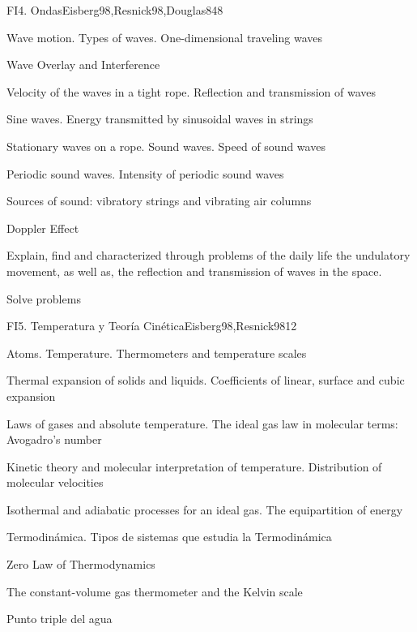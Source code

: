 \begin{syllabus}
\begin{unit}{FI4. Ondas}{Eisberg98,Resnick98,Douglas84}{8}
\begin{topics}
         \item  Wave motion. Types of waves. One-dimensional traveling waves
	 \item  Wave Overlay and Interference
         \item  Velocity of the waves in a tight rope. Reflection and transmission of waves
	 \item  Sine waves. Energy transmitted by sinusoidal waves in strings
         \item  Stationary waves on a rope. Sound waves. Speed of sound waves
	 \item  Periodic sound waves. Intensity of periodic sound waves
	 \item  Sources of sound: vibratory strings and vibrating air columns
	 \item  Doppler Effect
   \end{topics}

   \begin{unitgoals}
         \item  Explain, find and characterized  through problems of the daily life the undulatory movement, as well as, the reflection and transmission of waves in the space.
         \item  Solve problems
   \end{unitgoals}
\end{unit}

\begin{unit}{FI5. Temperatura y Teoría Cinética}{Eisberg98,Resnick98}{12}
\begin{topics}
         \item  Atoms. Temperature. Thermometers and temperature scales
	 \item  Thermal expansion of solids and liquids. Coefficients of linear, surface and cubic expansion
         \item  Laws of gases and absolute temperature. The ideal gas law in molecular terms: Avogadro's number
	 \item  Kinetic theory and molecular interpretation of temperature. Distribution of molecular velocities
         \item  Isothermal and adiabatic processes for an ideal gas. The equipartition of energy
	 \item  Termodinámica. Tipos de sistemas que estudia la Termodinámica
         \item  Zero Law of Thermodynamics
	 \item  The constant-volume gas thermometer and the Kelvin scale
         \item  Punto triple del agua
   \end{topics}


\end{unit}
\end{syllabus}

